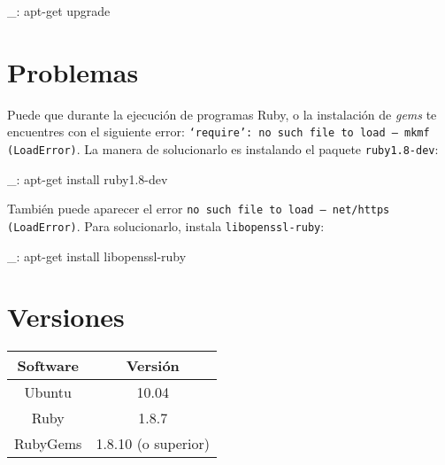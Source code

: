 \begin{bashcode}
_: apt-get upgrade
\end{bashcode}


\section{Problemas}

Puede que durante la ejecución de programas Ruby, o la instalación de \emph{gems} te encuentres con el siguiente error: \texttt{`require': no such file to load -- mkmf (LoadError)}. La manera de solucionarlo es instalando el paquete \texttt{ruby1.8-dev}:

\begin{bashcode}
_: apt-get install ruby1.8-dev
\end{bashcode}

También puede aparecer el error \texttt{no such file to load -- net/https (LoadError)}. Para solucionarlo, instala \texttt{libopenssl-ruby}:

\begin{bashcode}
_: apt-get install libopenssl-ruby
\end{bashcode}


\section{Versiones}

\begin{tabular}{|c|c|}
   \hline
   Software & Versión \\ \hline
   Ubuntu & 10.04 \\ \hline
   Ruby & 1.8.7 \\ \hline
   RubyGems & 1.8.10 (o superior) \\ \hline
\end{tabular}
